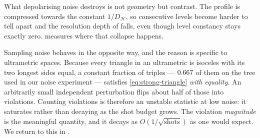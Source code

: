 What depolarising noise destroys is not geometry but contrast. The profile is
compressed towards the constant $1/D_{\mathcal{H}}$, so consecutive levels become harder to tell
apart and the resolution depth of  falls, even though level
constancy stays exactly zero.  measures where that collapse
happens.

Sampling noise behaves in the opposite way, and the reason is specific to ultrametric
spaces. Because every triangle in an ultrametric is isoceles with its two longest sides
equal, a constant fraction of triples --- $0.667$ of them on the tree used in
our noise experiment --- satisfies \cref{eq:strong-triangle} \emph{with equality}. An
arbitrarily small independent perturbation flips about half of those into violations.
Counting violations is therefore an unstable statistic at low noise: it saturates
rather than decaying as the shot budget grows. The violation \emph{magnitude} is the
meaningful quantity, and it decays as $O(1/\sqrt{\text{shots}})$ as one would expect.
We return to this in .
